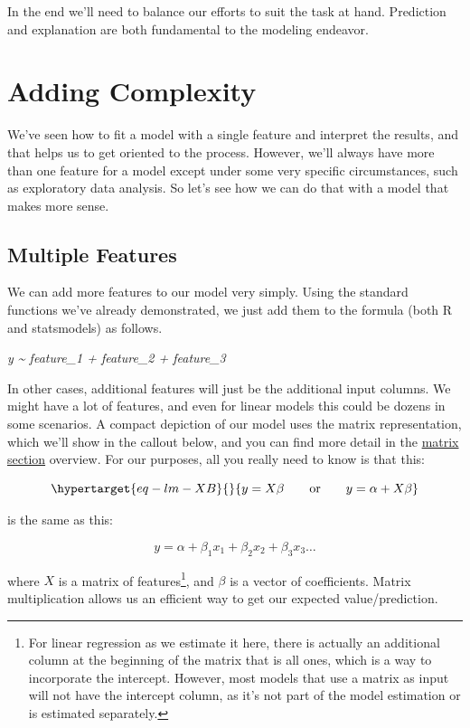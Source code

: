 \documentclass[
  letterpaper,
]{krantz}
\newenvironment{Shaded}{}{}
\newcommand{\CommentTok}[1]{\textcolor[rgb]{0.38,0.63,0.69}{\textit{#1}}}
\begin{document}
In the end we'll need to balance our efforts to suit the task at hand.
Prediction and explanation are both fundamental to the modeling
endeavor.

\section{Adding Complexity}\label{adding-complexity}

We've seen how to fit a model with a single feature and interpret the
results, and that helps us to get oriented to the process. However,
we'll always have more than one feature for a model except under some
very specific circumstances, such as exploratory data analysis. So let's
see how we can do that with a model that makes more sense.

\subsection{Multiple Features}\label{multiple-features}

We can add more features to our model very simply. Using the standard
functions we've already demonstrated, we just add them to the formula
(both R and statsmodels) as follows.

\begin{Shaded}
\begin{Highlighting}[]
\CommentTok{\textquotesingle{}y \textasciitilde{} feature\_1 + feature\_2 + feature\_3\textquotesingle{}}
\end{Highlighting}
\end{Shaded}

In other cases, additional features will just be the additional input
columns. We might have a lot of features, and even for linear models
this could be dozens in some scenarios. A compact depiction of our model
uses the matrix representation, which we'll show in the callout below,
and you can find more detail in the \hyperref[matrix]{matrix section}
overview. For our purposes, all you really need to know is that this:

\begin{equation}\protect\hypertarget{eq-lm-XB}{}{
y = X\beta\qquad  \textrm{or}\qquad y = \alpha + X\beta
}\label{eq-lm-XB}\end{equation}

is the same as this:

\[
y = \alpha + \beta_1 x_1 + \beta_2 x_2 + \beta_3 x_3 \dots
\]

where \(X\) is a matrix of features\footnote{For linear regression as we
  estimate it here, there is actually an additional column at the
  beginning of the matrix that is all ones, which is a way to
  incorporate the intercept. However, most models that use a matrix as
  input will not have the intercept column, as it's not part of the
  model estimation or is estimated separately.}, and \(\beta\) is a
vector of coefficients. Matrix multiplication allows us an efficient way
to get our expected value/prediction.
\end{document}
